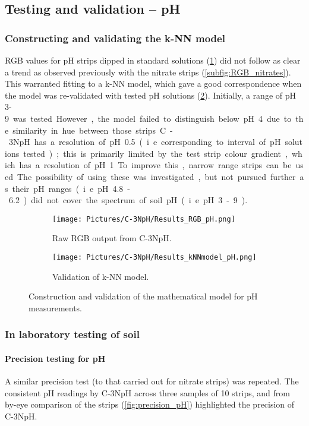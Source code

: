 \clearpage
\subsection{Testing and validation -- pH} \label{phresults_c3nph}
 
\subsubsection{Constructing and validating the k-NN model}
RGB values for pH strips dipped in standard solutions (\cref{subfig:RGB_pH}) did not follow as clear a trend as observed previously with the nitrate strips (\cref{subfig:RGB_nitrates}). This warranted fitting to a k-NN model, which gave a good correspondence when the model was re-validated with tested pH solutions (\cref{subfig:kNN_pH}). Initially, a range of pH {3}-\SI{9} was tested. However, the model failed to distinguish below pH {4} due to the similarity in hue between those strips. C-3NpH has a resolution of pH {0.5} (i.e. corresponding to interval of pH solutions tested); this is primarily limited by the test strip colour gradient, which has a resolution of pH 1. To improve this, narrow range strips can be used. The possibility of using these was investigated, but not pursued further as their pH ranges (i.e. pH {4.8}-\SI{6.2}) did not cover the spectrum of soil pH (i.e. pH {3}-\SI{9}).


\begin{figure}[h!]
	\centering
	\begin{subfigure}[b]{\linewidth} 
		\centering
		\texttt{[image: Pictures/C-3NpH/Results\_RGB\_pH.png]}
		\caption{Raw RGB output from C-3NpH.}
		\label{subfig:RGB_pH}
	\end{subfigure}
	\begin{subfigure}[b]{\linewidth}
	\centering
		\texttt{[image: Pictures/C-3NpH/Results\_kNNmodel\_pH.png]}
		\caption{Validation of k-NN model.}
		\label{subfig:kNN_pH}
	\end{subfigure}
	\captionsetup{justification = centering}
	\caption{Construction and validation of the mathematical model for pH measurements.}
	\label{fig:knn}
\end{figure}   	

\newpage
\subsubsection{In laboratory testing of soil}

\paragraph{Precision testing for pH}
A similar precision test (to that carried out for nitrate strips) was repeated. The consistent pH readings by C-3NpH across three samples of 10
strips, and from by-eye comparison of the strips (\cref{fig:precision_pH}) highlighted the precision of C-3NpH.


